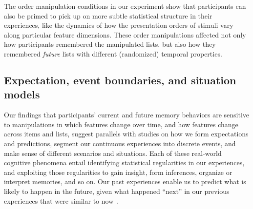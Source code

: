 \documentclass[11pt]{article}
\begin{document}
The order manipulation conditions in our experiment show that participants can
also be primed to pick up on more subtle statistical structure in their
experiences, like the dynamics of how the presentation orders of stimuli vary
along particular feature dimensions. These order manipulations affected not
only how participants remembered the manipulated lists, but also how they
remembered \textit{future} lists with different (randomized) temporal
properties.

\subsection*{Expectation, event boundaries, and situation models}

Our findings that participants' current and future memory behaviors are
sensitive to manipulations in which features change over time, and how features
change across items and lists, suggest parallels with studies on how we form
expectations and predictions, segment our continuous experiences into discrete
events, and make sense of different scenarios and situations. Each of these
real-world cognitive phenomena entail identifying statistical regularities in
our experiences, and exploiting those regularities to gain insight, form
inferences, organize or interpret memories, and so on. Our past experiences
enable us to predict what is likely to happen in the future, given what
happened ``next'' in our previous experiences that were similar to
now~\citep{Mann20, EichFort09, BarrEtal20, Brig12, ChowEtal16, GlucEtal02,
GoldEtal21, GrifStey03, JonePash07, KimEtal14, TamiThor18, XuEtal23}.
\end{document}
